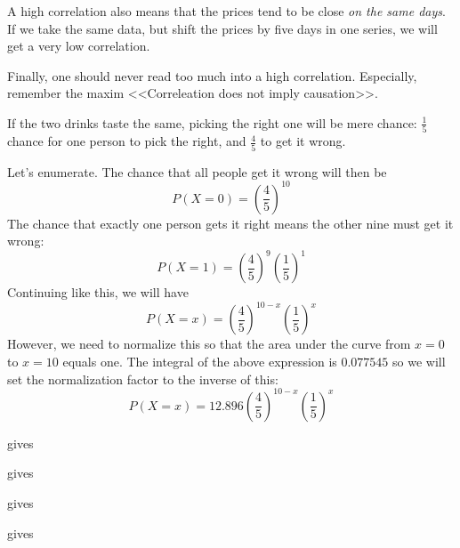 \documentclass[a4paper,english,12pt]{article}
\begin{document}
A high correlation also means that the prices tend to be close \textit{on the
same days}. If we take the same data, but shift the prices by five days in one
series, we will get a very low correlation.

Finally, one should never read too much into a high correlation. Especially,
remember the maxim <<Correleation does not imply causation>>.

If the two drinks taste the same, picking the right one will be mere chance:
$\frac{1}{5}$ chance for one person to pick the right, and $\frac{4}{5}$ to get
it wrong.

Let's enumerate. The chance that all people get it wrong will then be
\[
  P(X=0) = \left( \frac{4}{5} \right)^{10}
\]
The chance that exactly one person gets it right means the other nine must get
it wrong:
\[
  P(X=1) = \left( \frac{4}{5} \right)^{9} \left( \frac{1}{5} \right)^{1}
\]
Continuing like this, we will have
\[
  P(X=x) = \left( \frac{4}{5} \right)^{10-x} \left( \frac{1}{5} \right)^{x}
\]
However, we need to normalize this so that the area under the curve from $x=0$
to $x=10$ equals one. The integral of the above expression is $0.077545$ so we
will set the normalization factor to the inverse of this:
\[
  P(X=x) = 12.896\left( \frac{4}{5} \right)^{10-x} \left( \frac{1}{5} \right)^{x}
\]




\texttt{} gives
\texttt{}

\texttt{} gives
\texttt{}

 gives
\texttt{}

\texttt{} gives
\texttt{}

\end{document}
